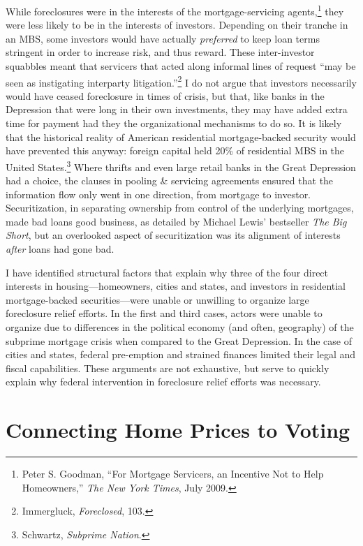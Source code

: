 \documentclass[12pt,oneside]{psthesis}
\begin{document}
While foreclosures were in the interests of the mortgage-servicing agents,\footnote{Peter S. Goodman, ``For Mortgage Servicers, an Incentive Not to Help Homeowners,'' \emph{The New York Times}, July 2009.} they were less likely to be in the interests of investors.
Depending on their tranche in an MBS, some investors would have actually \emph{preferred} to keep loan terms stringent in order to increase risk, and thus reward.
These inter-investor squabbles meant that servicers that acted along informal lines of request ``may be seen as instigating interparty litigation.''\footnote{Immergluck, \emph{Foreclosed}, 103.}
I do not argue that investors necessarily would have ceased foreclosure in times of crisis, but that, like banks in the Depression that were long in their own investments, they may have added extra time for payment had they the organizational mechanisms to do so.
It is likely that the historical reality of American residential mortgage-backed security would have prevented this anyway: foreign capital held 20\% of residential MBS in the United States.\footnote{Schwartz, \emph{Subprime Nation}.}
Where thrifts and even large retail banks in the Great Depression had a choice, the clauses in pooling \& servicing agreements ensured that the information flow only went in one direction, from mortgage to investor.
Securitization, in separating ownership from control of the underlying mortgages, made bad loans good business, as detailed by Michael Lewis' bestseller \emph{The Big Short}, but an overlooked aspect of securitization was its alignment of interests \emph{after} loans had gone bad.

I have identified structural factors that explain why three of the four direct interests in housing---homeowners, cities and states, and investors in residential mortgage-backed securities---were unable or unwilling to organize large foreclosure relief efforts.
In the first and third cases, actors were unable to organize due to differences in the political economy (and often, geography) of the subprime mortgage crisis when compared to the Great Depression.
In the case of cities and states, federal pre-emption and strained finances limited their legal and fiscal capabilities.
These arguments are not exhaustive, but serve to quickly explain why federal intervention in foreclosure relief efforts was necessary.

\hypertarget{motive-opportunity}{%
\chapter{Connecting Home Prices to Voting}\label{motive-opportunity}}
\end{document}
